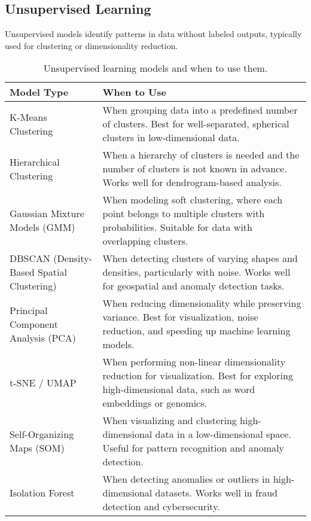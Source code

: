 \documentclass[12pt,openany]{book}
\begin{document}
\subsection{Unsupervised Learning}

Unsupervised models identify patterns in data without labeled outputs, 
typically used for clustering or dimensionality reduction.

\begin{table}[H]
    \centering
    \small
    \renewcommand{\arraystretch}{1.3} %
    \begin{tabular}{|l|p{8cm}|}
        \hline
        \textbf{Model Type} & \textbf{When to Use} \\
        \hline
        K-Means Clustering & When grouping data into a predefined number of clusters. Best for well-separated, spherical clusters in low-dimensional data. \\
        \hline
        Hierarchical Clustering & When a hierarchy of clusters is needed and the number of clusters is not known in advance. Works well for dendrogram-based analysis. \\
        \hline
        Gaussian Mixture Models (GMM) & When modeling soft clustering, where each point belongs to multiple clusters with probabilities. Suitable for data with overlapping clusters. \\
        \hline
        DBSCAN (Density-Based Spatial Clustering) & When detecting clusters of varying shapes and densities, particularly with noise. Works well for geospatial and anomaly detection tasks. \\
        \hline
        Principal Component Analysis (PCA) & When reducing dimensionality while preserving variance. Best for visualization, noise reduction, and speeding up machine learning models. \\
        \hline
        t-SNE / UMAP & When performing non-linear dimensionality reduction for visualization. Best for exploring high-dimensional data, such as word embeddings or genomics. \\
        \hline
        Self-Organizing Maps (SOM) & When visualizing and clustering high-dimensional data in a low-dimensional space. Useful for pattern recognition and anomaly detection. \\
        \hline
        Isolation Forest & When detecting anomalies or outliers in high-dimensional datasets. Works well in fraud detection and cybersecurity. \\
        \hline
    \end{tabular}
    \caption{Unsupervised learning models and when to use them.}
\end{table}
\end{document}
